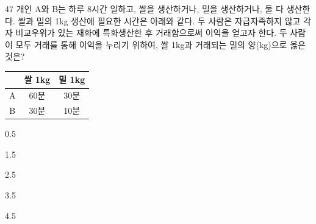 \begin{question}{47}
개인 A와 B는 하루 8시간 일하고, 쌀을 생산하거나, 밀을 생산하거나, 둘 다 생산한다. 쌀과 밀의 1kg 생산에 필요한 시간은 아래와 같다. 두 사람은 자급자족하지 않고 각자 비교우위가 있는 재화에 특화생산한 후 거래함으로써 이익을 얻고자 한다. 두 사람이 모두 거래를 통해 이익을 누리기 위하여, 쌀 1kg과 거래되는 밀의 양(kg)으로 옳은 것은?
\par
{\small\centering
\begin{tabular}{|c|c|c|}\hline
 & 쌀 1kg & 밀 1kg \\ \hline
A & 60분 & 30분 \\ \hline
B & 30분 & 10분 \\ \hline
\end{tabular}\par}
\begin{choices}
  \item 0.5
  \item 1.5
  \item 2.5
  \item 3.5
  \item 4.5
\end{choices}
\end{question}
